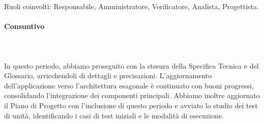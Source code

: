 Ruoli coinvolti: Responsabile, Amministratore, Verificatore, Analista, Progettista.
\begin{table}[H]
\centering
{}
\caption{Preventivo dell'impegno orario di ciascun membro durante il periodo VII}
\end{table}

\paragraph{Consuntivo} \hspace{1cm} 
\\ \hspace{1cm} \\
In questo periodo, abbiamo proseguito con la stesura della Specifica Tecnica e del Glossario, arricchendoli di dettagli e precisazioni. L’aggiornamento dell’applicazione verso l’architettura esagonale è continuato con buoni progressi, consolidando l’integrazione dei componenti principali. Abbiamo inoltre aggiornato il Piano di Progetto con l’inclusione di questo periodo e avviato lo studio dei test di unità, identificando i casi di test iniziali e le modalità di esecuzione.


